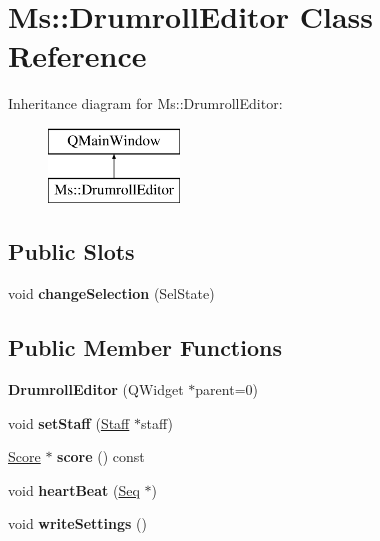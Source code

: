 \hypertarget{class_ms_1_1_drumroll_editor}{}\section{Ms\+:\+:Drumroll\+Editor Class Reference}
\label{class_ms_1_1_drumroll_editor}
Inheritance diagram for Ms\+:\+:Drumroll\+Editor\+:\begin{figure}[H]
\begin{center}
\leavevmode
\includegraphics[height=2.000000cm]{class_ms_1_1_drumroll_editor}
\end{center}
\end{figure}
\subsection*{Public Slots}
\begin{DoxyCompactItemize}
\item 
\mbox{\label{class_ms_1_1_drumroll_editor_afd5de1cd9a37eded782f98958f0dcd1f}} 
void {\bfseries change\+Selection} (Sel\+State)
\end{DoxyCompactItemize}
\subsection*{Public Member Functions}
\begin{DoxyCompactItemize}
\item 
\mbox{\label{class_ms_1_1_drumroll_editor_aae44105017101a7d8b937c58dad8177c}} 
{\bfseries Drumroll\+Editor} (Q\+Widget $\ast$parent=0)
\item 
\mbox{\label{class_ms_1_1_drumroll_editor_a37e8d68efa6763f163a4b0ba313d6884}} 
void {\bfseries set\+Staff} (\hyperlink{class_ms_1_1_staff}{Staff} $\ast$staff)
\item 
\mbox{\label{class_ms_1_1_drumroll_editor_a071964c466960b60645fa67f9a428fa0}} 
\hyperlink{class_ms_1_1_score}{Score} $\ast$ {\bfseries score} () const
\item 
\mbox{\label{class_ms_1_1_drumroll_editor_a1c2ff1e7bdd0b73e353ef234368afbd9}} 
void {\bfseries heart\+Beat} (\hyperlink{class_ms_1_1_seq}{Seq} $\ast$)
\item 
\mbox{\label{class_ms_1_1_drumroll_editor_a3cf83f6ef0481292e2cf9c88274ae418}} 
void {\bfseries write\+Settings} ()
\end{DoxyCompactItemize}


